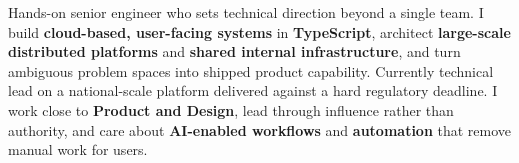 
\begin{cvparagraph}
Hands-on senior engineer who sets technical direction beyond a single team. I build \textbf{cloud-based, user-facing systems} in \textbf{TypeScript}, architect \textbf{large-scale distributed platforms} and \textbf{shared internal infrastructure}, and turn ambiguous problem spaces into shipped product capability. Currently technical lead on a national-scale platform delivered against a hard regulatory deadline. I work close to \textbf{Product and Design}, lead through influence rather than authority, and care about \textbf{AI-enabled workflows} and \textbf{automation} that remove manual work for users.
\end{cvparagraph}
